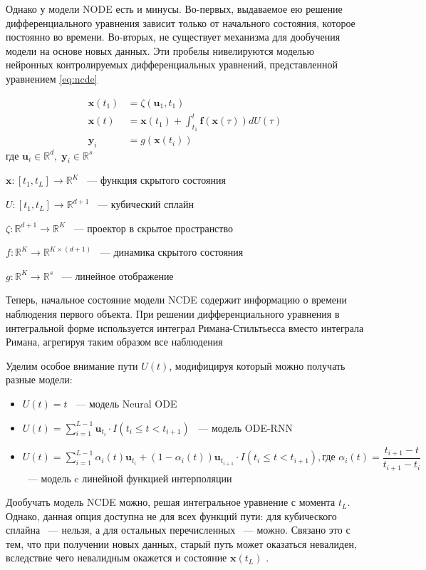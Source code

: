 \documentclass[a4paper, 12pt]{article}
\newcommand{\bx}{\mathbf{x}}
\newcommand{\by}{\mathbf{y}}
\newcommand{\bff}{\mathbf{f}}
\newcommand{\bu}{\mathbf{u}}
\newcommand{\dR}{\mathds{R}}
\begin{document}
	Однако у модели NODE есть и минусы.
	Во-первых, выдаваемое ею решение дифференциального уравнения зависит только от начального состояния, которое постоянно во времени.
	Во-вторых, не существует механизма для дообучения модели на основе новых данных.
	Эти пробелы нивелируются моделью нейронных контролируемых дифференциальных уравнений, представленной уравнением \ref{eq:ncde}
	
	\begin{equation}\label{eq:ncde}
		\begin{aligned}
			\bx(t_1) &= \zeta(\bu_1, t_1) \\
			\bx(t) &= \bx(t_1) + \int_{t_1}^t \bff(\bx(\tau))dU(\tau) \\
			\by_i &= g(\bx(t_i))
		\end{aligned}
	\end{equation}
	$\text{где } \bu_i \in \dR^d, \; \by_i \in \dR^s $
	
	$\bx: [t_1, t_L] \rightarrow \dR^K$ ~--- функция скрытого состояния
	
	$U: [t_1, t_L] \rightarrow \dR^{d+1}$ ~--- кубический сплайн 
	
	$\zeta: \dR^{d+1} \rightarrow \dR^K$ ~--- проектор в скрытое пространство
	
	$f: \dR^K \rightarrow \dR^{K \times (d+1)}$ ~--- динамика скрытого состояния

	$g: \dR^K \rightarrow \dR^s$ ~--- линейное отображение
	
	Теперь, начальное состояние модели NCDE содержит информацию о времени наблюдения первого объекта.
	При решении дифференциального уравнения в интегральной форме используется интеграл Римана-Стильтьесса вместо интеграла Римана, агрегируя таким образом все наблюдения
	
	Уделим особое внимание пути $U(t)$, модифицируя который можно получать разные модели:
	\begin{itemize}
		\item $U(t) = t$ ~--- модель Neural ODE \citep{node}
		\item $U(t) = \sum\limits_{i=1}^{L-1} \bu_{t_i} \cdot I(t_i \leqslant t < t_{i+1})$ ~--- модель ODE-RNN \citep{latent-ode}
		\item $U(t) = \sum\limits_{i=1}^{L-1} \alpha_i(t) \bu_{t_i} + (1-\alpha_i(t)) \bu_{t_{i+1}} \cdot I(t_i \leqslant t < t_{i+1}), \text{где } \alpha_i(t) = \dfrac{t_{i+1} - t}{t_{i+1} - t_i}$ ~--- модель c линейной функцией интерполяции
	\end{itemize}

	Дообучать модель NCDE можно, решая интегральное уравнение с момента $t_{L}$.
	Однако, данная опция доступна не для всех функций пути: для кубического сплайна ~--- нельзя, а для остальных перечисленных ~--- можно.
	Связано это с тем, что при получении новых данных, старый путь может оказаться невалиден, вследствие чего невалидным окажется и состояние $\bx(t_L)$ \citep{ncde-online}. 
	
\end{document}
